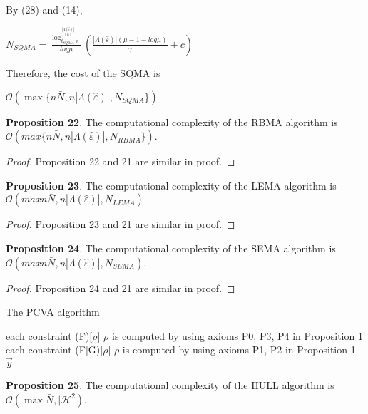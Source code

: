 \documentclass[]{iosart2c}
\begin{document}
    By (28) and (14),

    $N_{SQMA} =  \frac{ \log^{\frac{|\Lambda(\hat{\varepsilon})|}{(0)}}_{t_{SQMA} \in}}{log\mu}  \left( \frac{|\Lambda(\hat{\varepsilon})| (\mu - 1 - log\mu)}{\gamma} + c \right)$

    Therefore, the cost of the SQMA is

    $\mathcal{O}(\max\{n \bar N, n |\Lambda(\hat{\varepsilon})|,N_{SQMA}\})$

    \textbf{Proposition 22}. The computational complexity of the RBMA algorithm is $\mathcal{O}(max\{n \bar N, n |\Lambda(\hat{\varepsilon})|,N_{RBMA}\})$.

    \begin{proof}
        Proposition 22 and 21 are similar in proof.
    \end{proof}

    \textbf{Proposition 23}. The computational complexity of the LEMA algorithm is $\mathcal{O}(max{n \bar N, n |\Lambda(\hat{\varepsilon})|,N_{LEMA}})$

    \begin{proof}
        Proposition 23 and 21 are similar in proof.
    \end{proof}

    \textbf{Proposition 24}. The computational complexity of the
    SEMA algorithm is $\mathcal{O}(max{n \bar N, n |\Lambda(\hat{\varepsilon})|,N_{SEMA}})$.

    \begin{proof}
        Proposition 24 and 21 are similar in proof.
    \end{proof}

    \begin{algorithm}
        \caption{The PCVA algorithm}
        \begin{algorithmic}[1]
            \For
                each constraint (F)[$\rho$]
                \State $\rho$ is computed by using axioms P0, P3, P4 in Proposition 1
            \EndFor
            \For
                each constraint (F|G)[$\rho$]
                \State $\rho$ is computed by using axioms P1, P2 in Proposition 1
            \EndFor
            \State \Return $\vec{y}$
        \end{algorithmic}
    \end{algorithm}

    \textbf{Proposition 25}. The computational complexity of the
    HULL algorithm is $\mathcal{O}(\max{\bar N, |\mathcal{H}^2})$.
\end{document}
